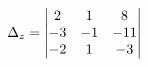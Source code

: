 \documentclass[preview]{standalone}
\begin{document}
\begin{align*}
\special{dvisvgm:raw <g id='unique000'>}\Delta_z = \begin{vmatrix} 2 & 1 & 8 \\ -3 & -1 & -11 \\ -2 & 1 & -3 \end{vmatrix}\special{dvisvgm:raw </g>}
\end{align*}
\end{document}
